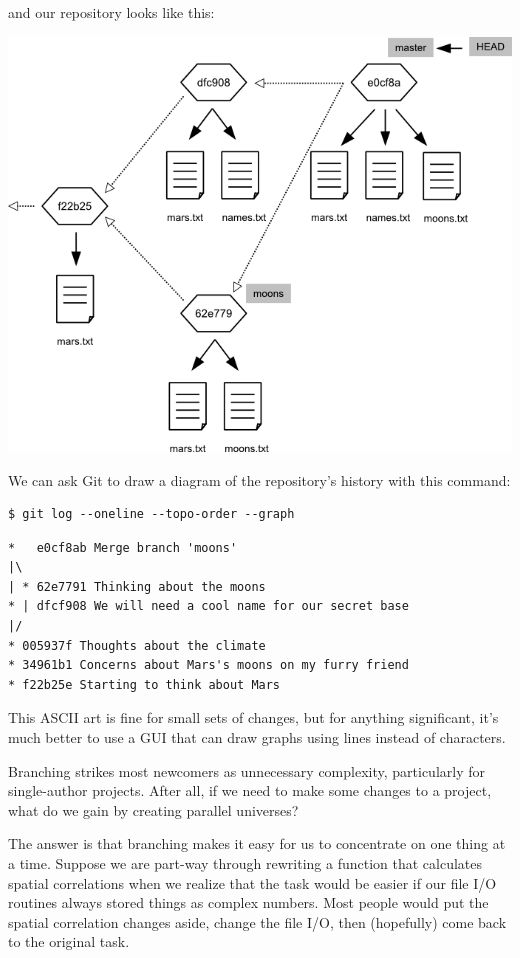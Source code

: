 \documentclass[]{book}
\begin{document}
and our repository looks like this:

\includegraphics{novice/extras/img/git-branching-06.png}

We can ask Git to draw a diagram of the repository's history with this
command:

\begin{verbatim}
$ git log --oneline --topo-order --graph
\end{verbatim}

\begin{verbatim}
*   e0cf8ab Merge branch 'moons'
|\
| * 62e7791 Thinking about the moons
* | dfcf908 We will need a cool name for our secret base
|/
* 005937f Thoughts about the climate
* 34961b1 Concerns about Mars's moons on my furry friend
* f22b25e Starting to think about Mars
\end{verbatim}

This ASCII art is fine for small sets of changes, but for anything
significant, it's much better to use a GUI that can draw graphs using
lines instead of characters.

Branching strikes most newcomers as unnecessary complexity, particularly
for single-author projects. After all, if we need to make some changes
to a project, what do we gain by creating parallel universes?

The answer is that branching makes it easy for us to concentrate on one
thing at a time. Suppose we are part-way through rewriting a function
that calculates spatial correlations when we realize that the task would
be easier if our file I/O routines always stored things as complex
numbers. Most people would put the spatial correlation changes aside,
change the file I/O, then (hopefully) come back to the original task.
\end{document}

